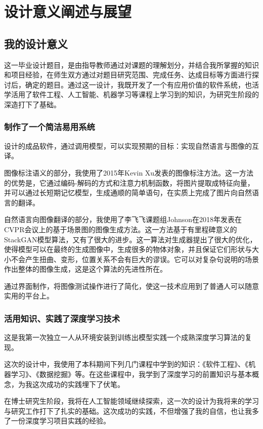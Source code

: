 
\chapter{设计意义阐述与展望}
\section{我的设计意义}
这一毕业设计题目，是由指导教师通过对课题的理解划分，并结合我所掌握的知识和项目经验，在师生双方通过对题目研究范围、完成任务、达成目标等方面进行探讨后，确定的题目。通过这一设计，我既开发了一个有应用价值的软件系统，也活学活用了软件工程、人工智能、机器学习等课程上学习到的知识，为研究生阶段的深造打下了基础。

\subsection{制作了一个简洁易用系统}
设计的成品软件，通过调用模型，可以实现预期的目标：实现自然语言与图像的互译。

图像标注语义的部分，我使用了2015年Kevin Xu发表的图像标注方法。这一方法的优势是，它通过编码-解码的方式和注意力机制函数，将图片提取成特征向量，并可以通过长短期记忆模型，生成通顺的简单语句，在实质上完成了图片向自然语言的翻译。

自然语言向图像翻译的部分，我使用了李飞飞课题组Johnson在2018年发表在CVPR会议上的基于场景图的图像生成方法。这一方法基于有里程碑意义的StackGAN模型算法，又有了很大的进步。这一算法对生成器提出了很大的优化，使得模型可以在最终的生成图像中，生成很多的物体对象，并且保证它们形状与大小不会产生扭曲、变形，位置关系不会有巨大的谬误。它可以对复杂句说明的场景作出整体的图像生成，这是这个算法的先进性所在。

通过界面制作，将图像测试操作进行了简化，使这一技术应用到了普通人可以随意实用的平台上。

\subsection{活用知识、实践了深度学习技术}
这是我第一次独立一人从环境安装到训练出模型实践一个成熟深度学习算法的复现。

这次的设计中，我使用了本科期间下列几门课程中学到的知识：《软件工程》、《机器学习》、《数据挖掘》等。在这些课程中，我学到了深度学习的前置知识与基本概念，为我这次成功的实践埋下了伏笔。

在博士研究生阶段，我将在人工智能领域继续探索，这一次的设计为我将来的学习与研究工作打下了扎实的基础。这次成功的实践，不但增强了我的自信，也让我多了一份深度学习项目实践的经验。

